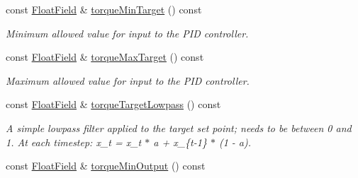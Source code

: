 \begin{DoxyCompactItemize}
\mbox{\label{classhebi_1_1Info_1_1Settings_1_1Actuator_1_1TorqueGains_a2e874f7f3aa680b4c3f0c09eb5ee0b07}} 
const \hyperlink{classhebi_1_1Info_1_1FloatField}{Float\+Field} \& \hyperlink{classhebi_1_1Info_1_1Settings_1_1Actuator_1_1TorqueGains_a2e874f7f3aa680b4c3f0c09eb5ee0b07}{torque\+Min\+Target} () const
\begin{DoxyCompactList}\small\item\em Minimum allowed value for input to the P\+ID controller. \end{DoxyCompactList}\item 
\mbox{\label{classhebi_1_1Info_1_1Settings_1_1Actuator_1_1TorqueGains_a9b2aeaab0c51a9eb129e2d299cf7f6e3}} 
const \hyperlink{classhebi_1_1Info_1_1FloatField}{Float\+Field} \& \hyperlink{classhebi_1_1Info_1_1Settings_1_1Actuator_1_1TorqueGains_a9b2aeaab0c51a9eb129e2d299cf7f6e3}{torque\+Max\+Target} () const
\begin{DoxyCompactList}\small\item\em Maximum allowed value for input to the P\+ID controller. \end{DoxyCompactList}\item 
\mbox{\label{classhebi_1_1Info_1_1Settings_1_1Actuator_1_1TorqueGains_ab4bba8551c981b7c500efeec4dbdf2b6}} 
const \hyperlink{classhebi_1_1Info_1_1FloatField}{Float\+Field} \& \hyperlink{classhebi_1_1Info_1_1Settings_1_1Actuator_1_1TorqueGains_ab4bba8551c981b7c500efeec4dbdf2b6}{torque\+Target\+Lowpass} () const
\begin{DoxyCompactList}\small\item\em A simple lowpass filter applied to the target set point; needs to be between 0 and 1. At each timestep\+: x\+\_\+t = x\+\_\+t $\ast$ a + x\+\_\+\{t-\/1\} $\ast$ (1 -\/ a). \end{DoxyCompactList}\item 
\mbox{\label{classhebi_1_1Info_1_1Settings_1_1Actuator_1_1TorqueGains_a286f95a583b05dce63bc42ed9d8d3771}} 
const \hyperlink{classhebi_1_1Info_1_1FloatField}{Float\+Field} \& \hyperlink{classhebi_1_1Info_1_1Settings_1_1Actuator_1_1TorqueGains_a286f95a583b05dce63bc42ed9d8d3771}{torque\+Min\+Output} () const

\end{DoxyCompactItemize}

